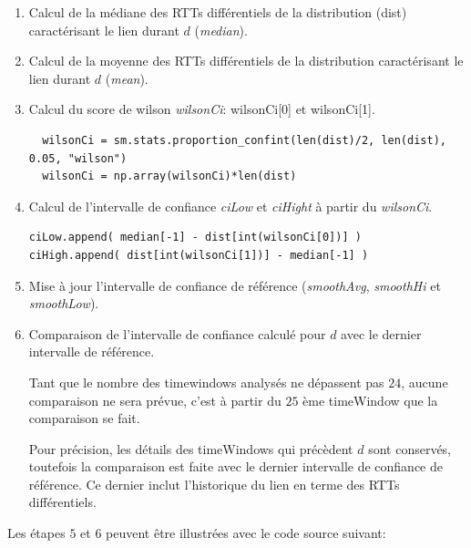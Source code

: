  \begin{enumerate}
 	\item Calcul de la médiane des RTTs différentiels de la distribution (dist) caractérisant le lien durant $d$ (\textit{median}).
 	
 	\item Calcul de la moyenne des RTTs différentiels de la distribution caractérisant le lien durant $d$ (\textit{mean}).
 	
 	\item Calcul du score de wilson \textit{wilsonCi}: wilsonCi[0] et wilsonCi[1].
 	
\begin{lstlisting}
  wilsonCi = sm.stats.proportion_confint(len(dist)/2, len(dist), 0.05, "wilson")
  wilsonCi = np.array(wilsonCi)*len(dist)
\end{lstlisting}
 	
 	\item Calcul de l'intervalle de confiance \textit{ciLow} et \textit{ciHight} à partir du \textit{wilsonCi}.
 	
\begin{lstlisting}
ciLow.append( median[-1] - dist[int(wilsonCi[0])] )
ciHigh.append( dist[int(wilsonCi[1])] - median[-1] )
\end{lstlisting}
 	\item Mise à jour l'intervalle de confiance de référence (\textit{smoothAvg}, \textit{smoothHi} et \textit{smoothLow}).
 	
 	\item  Comparaison de l'intervalle de confiance calculé pour $d$  avec le dernier intervalle de référence. 
 	
 	Tant que le nombre des timewindows analysés ne dépassent pas $ 24 $, aucune comparaison ne sera prévue, c'est à partir du $25$ ème timeWindow que la comparaison se fait.
 	
 	
 	Pour précision, les détails des timeWindows qui précèdent $d$ sont conservés, toutefois la comparaison est faite avec le  dernier intervalle de confiance de référence. Ce dernier inclut l'historique du lien en terme des RTTs différentiels.
 	
 	
 \end{enumerate}
 
 Les étapes $ 5 $ et $ 6 $ peuvent être illustrées avec le code source suivant:
 
